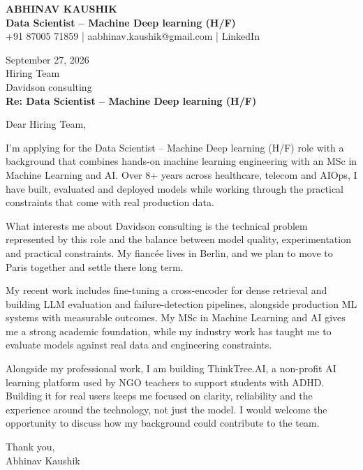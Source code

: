 \documentclass[10pt,a4paper]{article}
\begin{document}
\begin{center}
{\Large\bfseries ABHINAV KAUSHIK}\\[2pt]
{\bfseries Data Scientist – Machine Deep learning (H/F)}\\[2pt]
+91 87005 71859 \quad | \quad aabhinav.kaushik@gmail.com \quad | \quad LinkedIn
\end{center}
\vspace{8pt}
September 27, 2026\\[6pt]
Hiring Team\\
Davidson consulting\\[4pt]
\textbf{Re: Data Scientist – Machine Deep learning (H/F)}

Dear Hiring Team,

I’m applying for the Data Scientist – Machine Deep learning (H/F) role with a background that combines hands-on machine learning engineering with an MSc in Machine Learning and AI. Over 8+ years across healthcare, telecom and AIOps, I have built, evaluated and deployed models while working through the practical constraints that come with real production data.

What interests me about Davidson consulting is the technical problem represented by this role and the balance between model quality, experimentation and practical constraints. My fiancée lives in Berlin, and we plan to move to Paris together and settle there long term.

My recent work includes fine-tuning a cross-encoder for dense retrieval and building LLM evaluation and failure-detection pipelines, alongside production ML systems with measurable outcomes. My MSc in Machine Learning and AI gives me a strong academic foundation, while my industry work has taught me to evaluate models against real data and engineering constraints.

Alongside my professional work, I am building ThinkTree.AI, a non-profit AI learning platform used by NGO teachers to support students with ADHD. Building it for real users keeps me focused on clarity, reliability and the experience around the technology, not just the model. I would welcome the opportunity to discuss how my background could contribute to the team.

Thank you,\\
Abhinav Kaushik
\end{document}
